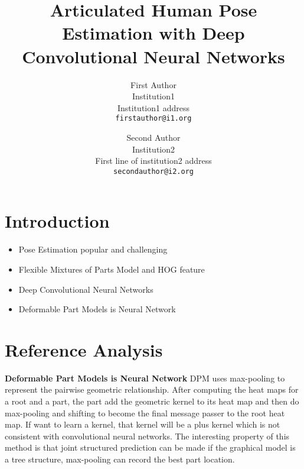 \documentclass[10pt,twocolumn,letterpaper]{article}
\begin{document}
\title{Articulated Human Pose Estimation with Deep Convolutional Neural Networks}

\author{First Author\\
Institution1\\
Institution1 address\\
{\tt\small firstauthor@i1.org}
\and
Second Author\\
Institution2\\
First line of institution2 address\\
{\tt\small secondauthor@i2.org}
}

\maketitle

\begin{abstract}
\end{abstract}

\section{Introduction}
\begin{itemize}
  \item Pose Estimation popular and challenging
  \item Flexible Mixtures of Parts Model and HOG feature
  \item Deep Convolutional Neural Networks
  \item Deformable Part Models is Neural Network
\end{itemize}

\section{Reference Analysis}
{\bf Deformable Part Models is Neural Network} DPM uses max-pooling to represent the pairwise geometric relationship. After computing the heat maps for a root and a part, the part add the geometric kernel to its heat map and then do max-pooling and shifting to become the final message passer to the root heat map. If want to learn a kernel, that kernel will be a plus kernel which is not consistent with convolutional neural networks. The interesting property of this method is that joint structured prediction can be made if the graphical model is a tree structure, max-pooling can record the best part location.
\end{document}
